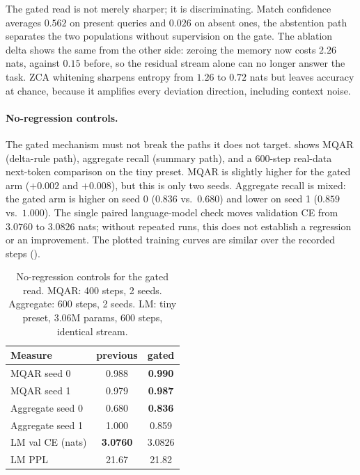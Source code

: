 The gated read is not merely sharper; it is discriminating. Match confidence averages
$0.562$ on present queries and $0.026$ on absent ones, \ie the abstention path separates the
two populations without supervision on the gate. The ablation delta shows the same from the
other side: zeroing the memory now costs $2.26$ nats, against $0.15$ before, so the residual
stream alone can no longer answer the task. ZCA whitening sharpens entropy from $1.26$ to
$0.72$ nats but leaves accuracy at chance, because it amplifies every deviation direction,
including context noise.

\paragraph{No-regression controls.}
The gated mechanism must not break the paths it does not target.  shows
MQAR (delta-rule path), aggregate recall (summary path), and a 600-step real-data next-token
comparison on the tiny preset. MQAR is slightly higher for the gated arm ($+0.002$ and
$+0.008$), but this is only two seeds. Aggregate recall is mixed: the gated arm is higher on
seed 0 ($0.836$ vs.\ $0.680$) and lower on seed 1 ($0.859$ vs.\ $1.000$). The single paired
language-model check moves validation CE from $3.0760$ to $3.0826$ nats; without repeated
runs, this does not establish a regression or an improvement. The plotted training curves are
similar over the recorded steps ().

\begin{table}[t]
\centering
\caption{No-regression controls for the gated read. MQAR: 400 steps, 2 seeds. Aggregate:
600 steps, 2 seeds. LM: tiny preset, 3.06M params, 600 steps, identical stream.}
\label{tab:regression}
\small
\begin{tabularx}{\columnwidth}{@{}l c c@{}}
\toprule
Measure & previous & gated \\
\midrule
MQAR seed 0 & 0.988 & \textbf{0.990} \\
MQAR seed 1 & 0.979 & \textbf{0.987} \\
Aggregate seed 0 & 0.680 & \textbf{0.836} \\
Aggregate seed 1 & 1.000 & 0.859 \\
LM val CE (nats) & \textbf{3.0760} & 3.0826 \\
LM PPL & 21.67 & 21.82 \\
\bottomrule
\end{tabularx}
\end{table}


